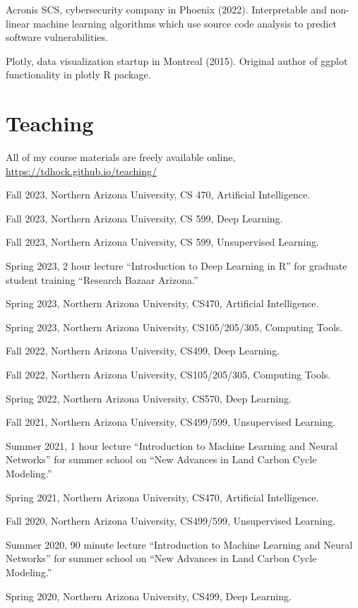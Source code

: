 \documentclass[margin,line]{res}
\begin{document}
\begin{resume}
Acronis SCS, cybersecurity company in Phoenix (2022). Interpretable
and non-linear machine learning algorithms which use source code
analysis to predict software vulnerabilities.

Plotly, data visualization startup in Montreal (2015). Original author
of ggplot functionality in plotly R package.

\section{\sc Teaching}

All of my course materials are freely available online,
\url{https://tdhock.github.io/teaching/}

Fall 2023, Northern Arizona University, CS 470, Artificial Intelligence.

Fall 2023, Northern Arizona University, CS 599, Deep Learning.

Fall 2023, Northern Arizona University, CS 599, Unsupervised Learning.

Spring 2023, 2 hour lecture ``Introduction to Deep Learning in R'' for
graduate student training ``Research Bazaar Arizona.''

Spring 2023, Northern Arizona University, CS470, Artificial Intelligence.

Spring 2023, Northern Arizona University, CS105/205/305, Computing Tools.

Fall 2022, Northern Arizona University, CS499, Deep Learning.

Fall 2022, Northern Arizona University, CS105/205/305, Computing Tools.

Spring 2022, Northern Arizona University, CS570, Deep Learning.

Fall 2021, Northern Arizona University, CS499/599, Unsupervised Learning.

Summer 2021, 1 hour lecture ``Introduction to Machine Learning and
Neural Networks'' for summer school on ``New Advances in Land Carbon
Cycle Modeling.''

Spring 2021, Northern Arizona University, CS470, Artificial Intelligence.

Fall 2020, Northern Arizona University, CS499/599, Unsupervised
Learning.

Summer 2020, 90 minute lecture ``Introduction to Machine Learning and
Neural Networks'' for summer school on ``New Advances in Land Carbon
Cycle Modeling.''

Spring 2020, Northern Arizona University, CS499, Deep Learning.


\end{resume}
\end{document}
